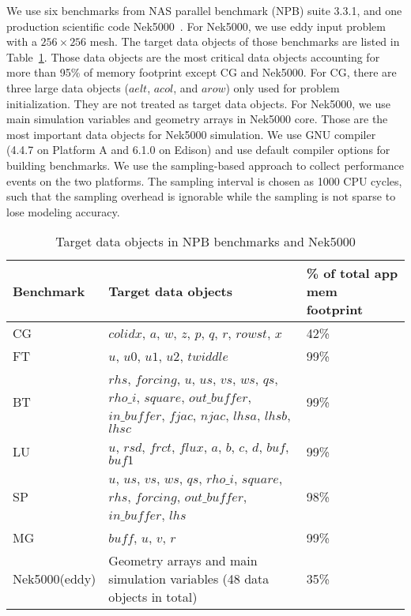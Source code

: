 We use six benchmarks from NAS parallel benchmark (NPB) suite 3.3.1,
and one production scientific code Nek5000~\cite{27-nek5000}.
For Nek5000, we use eddy input problem with a $256\times256$ mesh.
The target data objects of those benchmarks are listed in Table~\ref{tab:data_objects_list}.
Those data objects are the most critical data objects accounting for more than 95\% of
memory footprint except CG and Nek5000. For CG, there are three large data objects ($aelt$, $acol$, and $arow$) only used for problem initialization. They are not treated as target data objects.
For Nek5000, we use main simulation variables and geometry arrays in Nek5000 core. Those are the most important data objects for Nek5000 simulation.
We use GNU compiler (4.4.7 on Platform A and 6.1.0 on Edison) and use default compiler options for building benchmarks. We use the sampling-based approach to collect performance events on the two
platforms. The sampling interval is chosen as 1000 CPU cycles, such that the sampling overhead is ignorable while the sampling is not sparse to lose modeling accuracy. 
\vspace{-10pt}

\begin{table}
        \begin{center}
        \caption{Target data objects in NPB benchmarks and Nek5000}
        \vspace{-10pt}
        \label{tab:data_objects_list}
        \tiny
        \begin{tabular}{|p{1.2cm}|p{4cm}|p{2cm}|}
        \hline
        \textbf{Benchmark}    & \textbf{Target data objects}  &\textbf{\% of total app mem footprint}                                 \\ \hline \hline
         CG &  $colidx$, $a$, $w$, $z$, $p$, $q$, $r$, $rowst$, $x$ &  42\%  \\ \hline
         FT & $u$, $u0$, $u1$, $u2$, $twiddle$ & 99\%    \\ \hline
         BT & $rhs$, $forcing$, $u$, $us$, $vs$, $ws$, $qs$, $rho\_i$, $square$, $out\_buffer$, $in\_buffer$, $fjac$, $njac$, $lhsa$, $lhsb$, $lhsc$ &  99\% \\ \hline 
         LU & $u$, $rsd$, $frct$, $flux$, $a$, $b$, $c$, $d$, $buf$, $buf1$  &  99\%  \\ \hline
         SP & $u$, $us$, $vs$, $ws$, $qs$, $rho\_i$, $square$, $rhs$, $forcing$, $out\_buffer$, $in\_buffer$, $lhs$ & 98\%  \\ \hline
         MG & $buff$, $u$, $v$, $r$ & 99\%					\\ \hline
         Nek5000(eddy) &  Geometry arrays and main simulation variables (48 data objects in total) & 35\% \\ \hline
        \end{tabular}
        \end{center}
        \vspace{-10pt}
\end{table}
